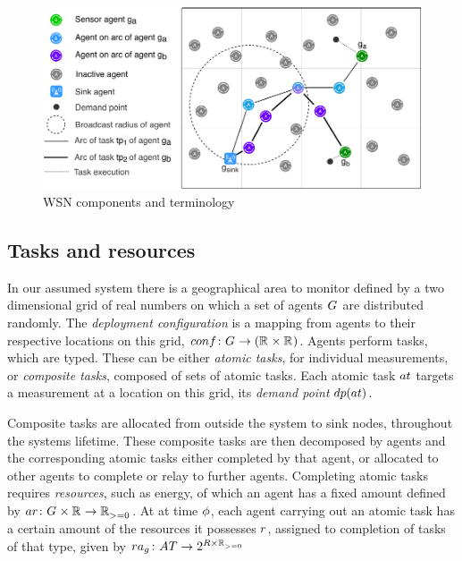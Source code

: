 \newcommand{\setSinkAgents}[2]{\setSymbol{SG}{#1}{#2}}
\newcommand{\formalAgentResources}[2]{
	\functionFormal{ar}
	{\setAgents{}{} \times \setRealNumbers{}{}}
	{\setRealNumbersNonNegative{}{}}
}
\newcommand{\functionAgentResources}[2]{
	\functionSignature{ar}{\varAgent{}{}, \varResource{}{}}
}
\newcommand{\formalSinkMapping}[2]{
	\functionFormal{sg}
	{\setCompositeTask{}{}}
	{\powerSetSymbol{\setSinkAgents{#1}{#2}}{}{}}
}



\begin{figure}
\centering 
\includegraphics[width=0.9\linewidth, trim={25pt 0pt 24pt 0pt, clip}]{grid_concept}
\caption[WSN deployment terminology]{WSN components and terminology}
\label{fig:grid_concept}
\end{figure}

\subsection{Tasks and resources}

In our assumed system there is a geographical area to monitor defined by a two dimensional grid of real numbers on which a set of agents $G_{}^{}$ are distributed randomly. The \textit{deployment configuration} is a mapping from agents to their respective locations on this grid, $\formalDeployment{}{}$. Agents perform tasks, which are typed. These can be either \textit{atomic tasks}, for individual measurements, or \textit{composite tasks}, composed of sets of atomic tasks. Each atomic task $\varAtomicTask{}{}$ targets a measurement at a location on this grid, its \textit{demand point} $\functionTaskDemandPoint{}{}$.

Composite tasks are allocated from outside the system to sink nodes, throughout the systems lifetime. These composite tasks are then decomposed by agents and the corresponding atomic tasks either completed by that agent, or allocated to other agents to complete or relay to further agents. Completing atomic tasks requires \textit{resources}, such as energy, of which an agent has a fixed amount defined by $\formalAgentResources{}{}$. At at time $\phi$, each agent carrying out an atomic task has a certain amount of the resources it possesses $\varResource{}{}$, assigned to completion of tasks of that type, given by $\formalTaskResourceAllocation{}{}$

